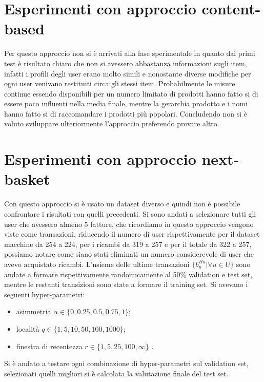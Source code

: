 \section{Esperimenti con approccio content-based}
Per questo approccio non si è arrivati alla fase sperimentale in quanto dai primi test è risultato chiaro che non si avessero abbastanza informazioni sugli item, infatti i profili degli user erano molto simili e nonostante diverse modifiche per ogni user venivano restituiti circa gli stessi item. Probabilmente le misure continue essendo disponibili per un numero limitato di prodotti hanno fatto si di essere poco influenti nella media finale, mentre la gerarchia prodotto e i nomi hanno fatto si di raccomandare i prodotti più popolari. Concludendo non si è voluto sviluppare ulteriormente l'approccio preferendo provare altro.

\section{Esperimenti con approccio next-basket}
Con questo approccio si è usato un dataset diverso e quindi non è possibile confrontare i risultati con quelli precedenti. Si sono andati a selezionare tutti gli user che avessero almeno 5 fatture, che ricordiamo in questo approccio vengono viste come transazioni, riducendo il numero di user rispettivamente per il dataset macchine da 254 a 224, per i ricambi da 319 a 257 e per il totale da 322 a 257, possiamo notare come siano stati eliminati un numero considerevole di user che avevo acquistato ricambi. L'nsieme delle ultime transazioni $\{b_{u}^{Bu}| \forall u \in U\}$ sono andate a formare rispettivamente randomicamente al 50\% validation e test set, mentre le restanti transizioni sono state a formare il training set. 
\newpage
Si avevano i seguenti hyper-parametri:
\begin{itemize}
    \item asimmetria $\alpha \in \{0, 0.25, 0.5, 0.75, 1\}$;
    \item località $q \in \{1, 5, 10, 50, 100, 1000\}$;
    \item finestra di recentezza $r \in \{1, 5, 25, 100, \infty \}$ .
\end{itemize}

Si è andato a testare ogni combinazione di hyper-parametri sul validation set, selezionati quelli migliori si è calcolata la valutazione finale del test set.